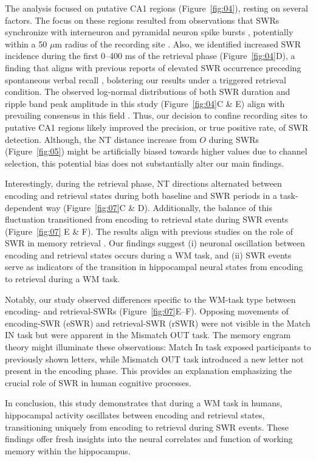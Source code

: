 The analysis focused on putative CA1 regions (Figure~\ref{fig:04}), resting on several factors. The focus on these regions resulted from observations that SWRs synchronize with interneuron and pyramidal neuron spike bursts \cite{buzsaki_two-stage_1989} \cite{quyen_cell_2008} \cite{royer_control_2012} \cite{hajos_input-output_2013}, potentially within a 50 $\mu$m radius of the recording site \cite{schomburg_spiking_2012}. Also, we identified increased SWR incidence during the first 0--400 ms of the retrieval phase (Figure~\ref{fig:04}D), a finding that aligns with previous reports of elevated SWR occurrence preceding spontaneous verbal recall \cite{norman_hippocampal_2019} \cite{norman_hippocampal_2021}, bolstering our results under a triggered retrieval condition. The observed log-normal distributions of both SWR duration and ripple band peak amplitude in this study (Figure~\ref{fig:04}C \& E) align with prevailing consensus in this field \cite{liu_consensus_2022}. Thus, our decision to confine recording sites to putative CA1 regions likely improved the precision, or true positive rate, of SWR detection. Although, the NT distance increase from $O$ during SWRs (Figure~\ref{fig:05}) might be artificially biased towards higher values due to channel selection, this potential bias does not substantially alter our main findings.

Interestingly, during the retrieval phase, NT directions alternated between encoding and retrieval states during both baseline and SWR periods in a task-dependent way (Figure~\ref{fig:07}C \& D). Additionally, the balance of this fluctuation transitioned from encoding to retrieval state during SWR events (Figure~\ref{fig:07} E \& F). The results align with previous studies on the role of SWR in memory retrieval \cite{norman_hippocampal_2019} \cite{norman_hippocampal_2021}. Our findings suggest (i) neuronal oscillation between encoding and retrieval states occurs during a WM task, and (ii) SWR events serve as indicators of the transition in hippocampal neural states from encoding to retrieval during a WM task.

Notably, our study observed differences specific to the WM-task type between encoding- and retrieval-SWRs (Figure~\ref{fig:07}E--F). Opposing movements of encoding-SWR (eSWR) and retrieval-SWR (rSWR) were not visible in the Match IN task but were apparent in the Mismatch OUT task. The memory engram theory \cite{liu_optogenetic_2012} might illuminate these observations: Match In task exposed participants to previously shown letters, while Mismatch OUT task introduced a new letter not present in the encoding phase. This provides an explanation emphasizing the crucial role of SWR in human cognitive processes.

In conclusion, this study demonstrates that during a WM task in humans, hippocampal activity oscillates between encoding and retrieval states, transitioning uniquely from encoding to retrieval during SWR events. These findings offer fresh insights into the neural correlates and function of working memory within the hippocampus.
\label{sec:discussion}